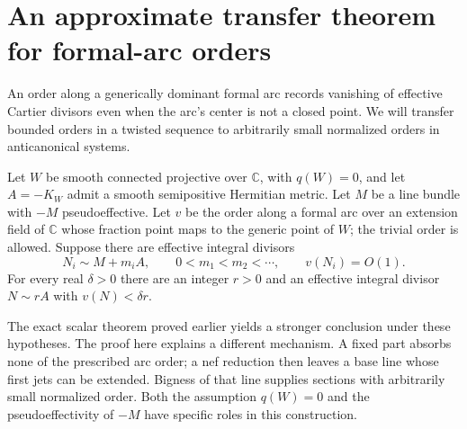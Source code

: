\section{An approximate transfer theorem for formal-arc orders}
\label{V:sec-transfer}

An order along a generically dominant formal arc records vanishing of
effective Cartier divisors even when the arc's center is not a closed
point.  We will transfer bounded orders in a twisted sequence to
arbitrarily small normalized orders in anticanonical systems.

\begin{theorem}\label{V:approximate-arc}
Let $W$ be smooth connected projective over $\mathbb C$, with
$q(W)=0$, and let $A=-K_W$ admit a smooth semipositive Hermitian
metric.  Let $M$ be a line bundle with $-M$ pseudoeffective.  Let $v$
be the order along a formal arc over an extension field of
$\mathbb C$ whose fraction point maps to the generic point of $W$;
the trivial order is allowed.  Suppose there are effective integral
divisors
\[
 N_i\sim M+m_iA,\qquad 0<m_1<m_2<\cdots,
 \qquad v(N_i)=O(1).
\]
For every real $\delta>0$ there are an integer $r>0$ and an effective
integral divisor $N\sim rA$ with $v(N)<\delta r$.
\end{theorem}

The exact scalar theorem proved earlier yields a stronger conclusion
under these hypotheses.  The proof here explains a different
mechanism.  A fixed part absorbs none of the prescribed arc order;
a nef reduction then leaves a base line whose first jets can be
extended.  Bigness of that line supplies sections with arbitrarily
small normalized order.  Both the assumption $q(W)=0$ and the
pseudoeffectivity of $-M$ have specific roles in this construction.


